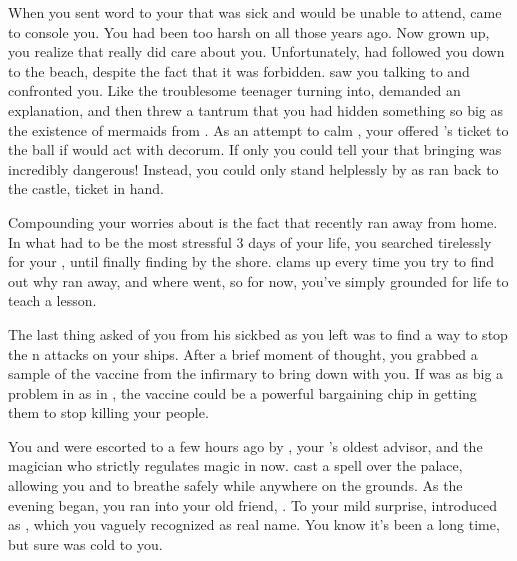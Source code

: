 \documentclass[char]{NeptuneBall}
\begin{document}
When you sent word to your \cKing{\parent} that \cEric{} was sick and would be unable to attend, \cKing{} came to console you. You had been too harsh on \cKing{\them} all those years ago. Now grown up, you realize that \cKing{} really did care about you. Unfortunately, \cWillow{} had followed you down to the beach, despite the fact that it was forbidden. \cWillow{\They} saw you talking to \cKing{} and confronted you. Like the troublesome teenager \cWillow{\they} \cWillow{\were} turning into, \cWillow{} demanded an explanation, and then threw a tantrum that you had hidden something so big as the existence of mermaids from \cWillow{\them}. As an attempt to calm \cWillow{}, your \cKing{\parent} offered \cWillow{\them} \cEric{}'s ticket to the ball if \cWillow{\they} would act with decorum. If only you could tell your \cKing{\parent} that bringing \cWillow{} was incredibly dangerous! Instead, you could only stand helplessly by as \cWillow{} ran back to the castle, ticket in hand.

Compounding your worries about \cWillow{} is the fact that \cWillow{\they} recently ran away from home. In what had to be the most stressful 3 days of your life, you searched tirelessly for your \cWillow{\offspring}, until finally finding \cWillow{\them} by the shore. \cWillow{} clams up every time you try to find out why \cWillow{\they} ran away, and where \cWillow{\they} went, so for now, you've simply grounded \cWillow{\them} for life to teach \cWillow{\them} a lesson.

The last thing \cEric{} asked of you from his sickbed as you left was to find a way to stop the \pPacifica{}n attacks on your ships. After a brief moment of thought, you grabbed a sample of the \cPolio{} vaccine from the infirmary to bring down with you. If \cPolio{} was as big a problem in \pPacifica{} as in \pAtlantis{}, the \cPolio{} vaccine could be a powerful bargaining chip in getting them to stop killing your people. 

You and \cWillow{} were escorted to \pAtlantis{} a few hours ago by \cManta{}, your \cKing{\parent}'s oldest advisor, and the magician who strictly regulates magic in \pAtlantis{} now. \cManta{} cast a spell over the palace, allowing you and \cWillow{} to breathe safely while anywhere on the grounds. As the evening began, you ran into your old friend, \cPriest{}. To your mild surprise, \cPriest{\they} introduced \cPriest{\themself} as \cPriest{\MYname}, which you vaguely recognized as \cPriest{\their} real name. You know it's been a long time, but \cPriest{} sure was cold to you.
\end{document}
